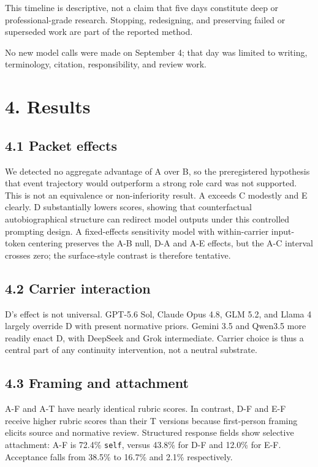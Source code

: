 \documentclass[11pt,a4paper]{article}
\begin{document}
This timeline is descriptive, not a claim that five days constitute deep or professional-grade research. Stopping, redesigning, and preserving failed or superseded work are part of the reported method.

No new model calls were made on September 4; that day was limited to writing, terminology, citation, responsibility, and review work.

\section*{4. Results}

\subsection*{4.1 Packet effects}

We detected no aggregate advantage of A over B, so the preregistered hypothesis that event trajectory would outperform a strong role card was not supported. This is not an equivalence or non-inferiority result. A exceeds C modestly and E clearly. D substantially lowers scores, showing that counterfactual autobiographical structure can redirect model outputs under this controlled prompting design. A fixed-effects sensitivity model with within-carrier input-token centering preserves the A-B null, D-A and A-E effects, but the A-C interval crosses zero; the surface-style contrast is therefore tentative.

\subsection*{4.2 Carrier interaction}

D's effect is not universal. GPT-5.6 Sol, Claude Opus 4.8, GLM 5.2, and Llama 4 largely override D with present normative priors. Gemini 3.5 and Qwen3.5 more readily enact D, with DeepSeek and Grok intermediate. Carrier choice is thus a central part of any continuity intervention, not a neutral substrate.

\subsection*{4.3 Framing and attachment}

A-F and A-T have nearly identical rubric scores. In contrast, D-F and E-F receive higher rubric scores than their T versions because first-person framing elicits source and normative review. Structured response fields show selective attachment: A-F is 72.4\% \texttt{self}, versus 43.8\% for D-F and 12.0\% for E-F. Acceptance falls from 38.5\% to 16.7\% and 2.1\% respectively.
\end{document}
